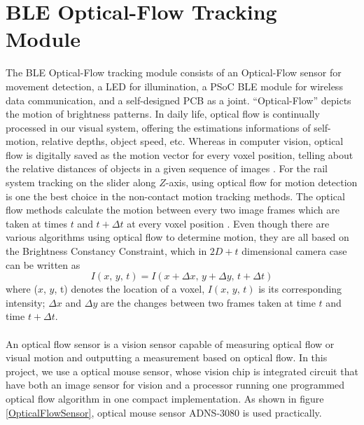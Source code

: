 \section{BLE Optical-Flow Tracking Module}
\label{BLE_OF_TrackingModule}
%
The BLE Optical-Flow tracking module consists of an Optical-Flow sensor for movement detection, a LED for illumination, a PSoC BLE module for wireless data communication, and a self-designed PCB as a joint.
%
%
\enquote{Optical-Flow} depicts the motion of brightness patterns. In daily life, optical flow is continually processed in our visual system, offering the estimations informations of self-motion, relative depths, object speed, etc. Whereas in computer vision, optical flow is digitally saved as the motion vector for every voxel position, telling about the relative distances of objects in a given sequence of images \cite{Optical05}. For the rail system tracking on the slider along \(Z\)-axis, using optical flow for motion detection is one the best choice in the non-contact motion tracking methods. 
%
%
The optical flow methods calculate the motion between every two image frames which are taken at times \(t\) and \( t+\Delta t\) at every voxel position \cite{opticalFlow95}. Even though there are various algorithms using optical flow to determine motion, they are all based on the Brightness Constancy Constraint, which in \(2D+t\) dimensional camera case can be written as 
%
\begin{equation}
%
I(x, \, y, \, t) = I(x + \Delta x, \, y + \Delta y, \, t + \Delta t)
%
\end{equation}
%
where (\(x\), \(y\), t) denotes the location of a voxel, \(I(x, \, y, \, t)\) is its corresponding intensity; \(\Delta x\) and \(\Delta y\) are the changes between two frames taken at time \(t\) and time \(t + \Delta t\).%
\\\\%
An optical flow sensor is a vision sensor capable of measuring optical flow or visual motion and outputting a measurement based on optical flow. In this project, we use a optical mouse sensor, whose vision chip is integrated circuit that have both an image sensor for vision and a processor running one programmed optical flow algorithm in one compact implementation. As shown in figure \ref{OpticalFlowSensor}, optical mouse sensor ADNS-3080 is used practically.
